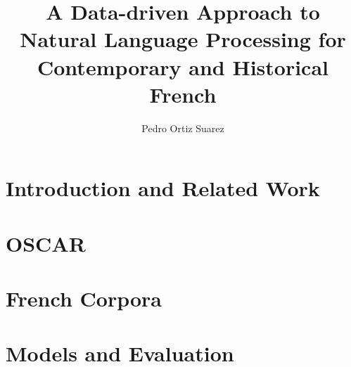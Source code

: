 \documentclass{mimosis}
\title{A Data-driven Approach to Natural Language Processing for Contemporary and Historical French}
\author{Pedro Ortiz Suarez}
\begin{document}
\frontmatter

% 

\tableofcontents

\mainmatter

\part{Introduction and Related Work}





\part{OSCAR}






\part{French Corpora}



\part{Models and Evaluation}






\appendix











\backmatter






\listoffigures

\listoftables


\end{document}
